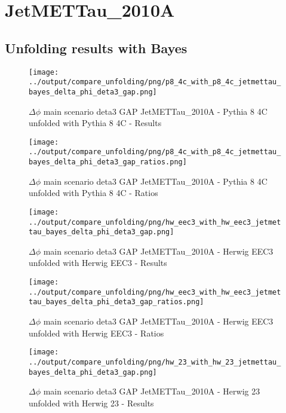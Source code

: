 \documentclass[11pt]{book}
\begin{document}
\section{JetMETTau\_2010A}
\subsection{Unfolding results with Bayes}

\begin{figure}[ht]
\centering
\texttt{[image: ../output/compare\_unfolding/png/p8\_4c\_with\_p8\_4c\_jetmettau\_bayes\_delta\_phi\_deta3\_gap.png]}
\caption{$\Delta\phi$ main scenario deta3 GAP JetMETTau\_2010A - Pythia 8 4C unfolded with Pythia 8 4C - Results}
\label{p8_p8_jetmettau_bayes_delta_phi_deta3_gap_a}
\end{figure}

\begin{figure}[ht]
\centering
\texttt{[image: ../output/compare\_unfolding/png/p8\_4c\_with\_p8\_4c\_jetmettau\_bayes\_delta\_phi\_deta3\_gap\_ratios.png]}
\caption{$\Delta\phi$ main scenario deta3 GAP JetMETTau\_2010A - Pythia 8 4C unfolded with Pythia 8 4C - Ratios}
\label{p8_p8_jetmettau_bayes_delta_phi_deta3_gap_b}
\end{figure}

\begin{figure}[ht]
\centering
\texttt{[image: ../output/compare\_unfolding/png/hw\_eec3\_with\_hw\_eec3\_jetmettau\_bayes\_delta\_phi\_deta3\_gap.png]}
\caption{$\Delta\phi$ main scenario deta3 GAP JetMETTau\_2010A - Herwig EEC3 unfolded with Herwig EEC3 - Results}
\label{hw_eec3_hw_eec3_jetmettau_bayes_delta_phi_deta3_gap_a}
\end{figure}

\begin{figure}[ht]
\centering
\texttt{[image: ../output/compare\_unfolding/png/hw\_eec3\_with\_hw\_eec3\_jetmettau\_bayes\_delta\_phi\_deta3\_gap\_ratios.png]}
\caption{$\Delta\phi$ main scenario deta3 GAP JetMETTau\_2010A - Herwig EEC3 unfolded with Herwig EEC3 - Ratios}
\label{hw_eec3_hw_eec3_jetmettau_bayes_delta_phi_deta3_gap_b}
\end{figure}

\begin{figure}[ht]
\centering
\texttt{[image: ../output/compare\_unfolding/png/hw\_23\_with\_hw\_23\_jetmettau\_bayes\_delta\_phi\_deta3\_gap.png]}
\caption{$\Delta\phi$ main scenario deta3 GAP JetMETTau\_2010A - Herwig 23 unfolded with Herwig 23 - Results}
\label{hw_23_hw_23_jetmettau_bayes_delta_phi_deta3_gap_a}
\end{figure}
\end{document}
